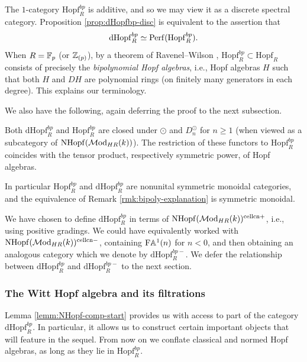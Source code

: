\documentclass{amsart}
\numberwithin{proposition}{section}
\numberwithin{equation}{section}
\def\cell{\mathrm{cell}}
\def\NHopf{\mathrm{NHopf}}
\def\Hopf{\mathrm{Hopf}}
\def\dHopf{\mathrm{dHopf}}
\def\Hopf{\mathrm{Hopf}}
\def\cn{\mathrm{cn}}
\def\Free{\mathrm{F}}
\def\Perf{\mathrm{Perf}}
\def\hotimes{\odot}
\begin{document}
\begin{remark} \label{rmk:bipoly-explanation}
The $1$-category $\Hopf_R^{bp}$ is additive, and so we may view it as a discrete spectral category.
Proposition \ref{prop:dHopfbp-disc} is equivalent to the assertion that \[ \dHopf_R^{bp} \wequi \Perf(\Hopf_R^{bp}). \]
When $R=\mathbb{F}_p$ (or $\mathbb{Z}_{(p)}$), by a theorem of Ravenel--Wilson \cite[Proposition~2.3]{ravenel-wilson-bipolynomial}, $\Hopf_R^{bp} \subset \Hopf_R$ consists of precisely the \emph{bipolynomial Hopf algebras}, i.e., Hopf algebras $H$ such that both $H$ and $DH$ are polynomial rings (on finitely many generators in each degree).
This explains our terminology.
\end{remark}

We also have the following, again deferring the proof to the next subsection.
\begin{lemma} \label{lemm:bipoly-monoidal}
Both $\dHopf_R^{bp}$ and $\Hopf_R^{bp}$ are closed under $\hotimes$ and $D_n^{\hotimes}$ for $n \ge 1$ (when viewed as a subcategory of $\NHopf(\Mod_{HR}(k))$).
The restriction of these functors to $\Hopf_R^{bp}$ coincides with the tensor product, respectively symmetric power, of Hopf algebras.
\end{lemma}

In particular $\Hopf_R^{bp}$ and $\dHopf_R^{bp}$ are nonunital symmetric monoidal categories, and the equivalence of Remark \ref{rmk:bipoly-explanation} is symmetric monoidal.

\begin{remark}
We have chosen to define $\dHopf_R^{bp}$ in terms of $\NHopf(\Mod_{HR}(k))^{\cell\cn+}$, i.e., using positive gradings.
We could have equivalently worked with $\NHopf(\Mod_{HR}(k))^{\cell\cn-}$, containing $\Free\A^1(n)$ for $n < 0$, and then obtaining an analogous category which we denote by $\dHopf_R^{bp-}$.
We defer the relationship between $\dHopf_R^{bp}$ and $\dHopf_R^{bp-}$ to the next section.
\end{remark}

\subsubsection{The Witt Hopf algebra and its filtrations} \label{subsub:witt}
Lemma \ref{lemm:NHopf-comp-start} provides us with access to part of the category $\dHopf_R^{bp}$.
In particular, it allows us to construct certain important objects that will feature in the sequel.
From now on we conflate classical and normed Hopf algebras, as long as they lie in $\Hopf_R^{bp}$.
\end{document}
